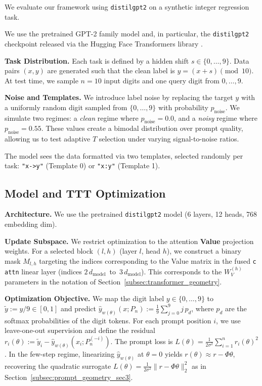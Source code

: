 \documentclass{article}
\theoremstyle{plain}
\theoremstyle{definition}
\theoremstyle{remark}
\begin{document}
We evaluate our framework using \texttt{distilgpt2} on a synthetic integer regression task.


We use the pretrained GPT-2 family model and, in particular, the \texttt{distilgpt2} checkpoint released via the Hugging Face Transformers library \citep{radford2019language,wolf-etal-2020-transformers,sanh2019distilbert}.


\textbf{Task Distribution.} Each task is defined by a hidden shift $s \in \{0, \dots, 9\}$. Data pairs $(x, y)$ are generated such that the clean label is $y = (x + s) \pmod{10}$. At test time, we sample $n=10$ input digits and one query digit from ${0,\ldots,9}$.

\textbf{Noise and Templates.} We introduce label noise by replacing the target $y$ with a uniformly random digit sampled from $\{0, \dots, 9\}$ with probability $p_{\text{noise}}$. We simulate two regimes: a \textit{clean} regime where $p_{\text{noise}}=0.0$, and a \textit{noisy} regime where $p_{\text{noise}}=0.55$. These values create a bimodal distribution over prompt quality, allowing us to test adaptive $T$ selection under varying signal-to-noise ratios.

The model sees the data formatted via two templates, selected randomly per task: \texttt{"x->y"} (Template 0) or \texttt{"x:y"} (Template 1).

\subsection{Model and TTT Optimization}

\textbf{Architecture.} We use the pretrained \texttt{distilgpt2} model (6 layers, 12 heads, 768 embedding dim).

\textbf{Update Subspace.} We restrict optimization to the attention \textbf{Value} projection weights. For a selected block $(l, h)$ (layer $l$, head $h$), we construct a binary mask $M_{l,h}$ targeting the indices corresponding to the Value matrix in the fused \texttt{c attn} linear layer (indices $2\, d_{\text{model}}$\ to\ $3\, d_{\text{model}}$). This corresponds to the $W_V^{(h)}$ parameters in the notation of Section~\ref{subsec:transformer_geometry}.


\textbf{Optimization Objective.}
We map the digit label $y\in\{0,\ldots,9\}$ to $\tilde y:=y/9\in[0,1]$ and predict $\widehat y_{w(\theta)}(x;P_n):=\frac{1}{9}\sum_{j=0}^9 j\,p_d$, where $p_d$ are the softmax probabilities of the digit tokens. For each prompt position $i$, we use leave-one-out supervision and define the residual
$r_i(\theta):=\tilde y_i-\widehat y_{w(\theta)}(x_i;P_n^{(-i)})$.
The prompt loss is $L(\theta)=\frac{1}{2\sigma^2}\sum_{i=1}^n r_i(\theta)^2$.
In the few-step regime, linearizing $\widehat y_{w(\theta)}$ at $\theta=0$ yields
$r(\theta)\approx r-\Phi\theta$, recovering the quadratic surrogate $L(\theta)=\frac{1}{2\sigma^2}\|r-\Phi\theta\|_2^2$ as in Section~\ref{subsec:prompt_geometry_sec3}.
\end{document}
